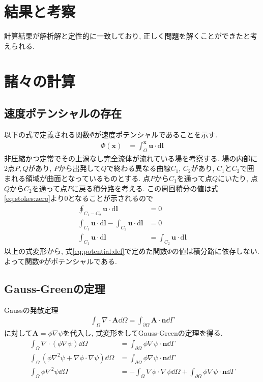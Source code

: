 \documentclass{ltjsarticle}
\begin{document}
\section{結果と考察}
計算結果が解析解と定性的に一致しており, 正しく問題を解くことができたと考えられる.

\clearpage
\printbibliography[title=参考文献]

\appendix
\section{諸々の計算}
\subsection{速度ポテンシャルの存在}
\label{appendix:potential}
以下の式で定義される関数$\Phi$が速度ポテンシャルであることを示す.
\begin{align}
    \Phi(\bm{x}) &= \int_O^{\bm{x}} \bm{u}\cdot\mathrm{d}\bm{l} \label{eq:potential:def}
\end{align}
非圧縮かつ定常でその上渦なし完全流体が流れている場を考察する.
場の内部に2点$P,Q$があり, $P$から出発して$Q$で終わる異なる曲線$C_1$, $C_2$があり,
$C_1$と$C_2$で囲まれる領域が曲面となっているものとする.
点$P$から$C_1$を通って点$Q$にいたり, 点$Q$から$C_2$を通って点$P$に戻る積分路を考える.
この周回積分の値は式\eqref{eq:stokes:zero}より0となることが示されるので
\begin{align}
    \oint_{C_1-C_2}\bm{u}\cdot\mathrm{d}\bm{l} &= 0 \\
    \int_{C_1}\bm{u}\cdot\mathrm{d}\bm{l}-\int_{C_2}\bm{u}\cdot\mathrm{d}\bm{l} &=0\\
    \int_{C_1}\bm{u}\cdot\mathrm{d}\bm{l}&=\int_{C_2}\bm{u}\cdot\mathrm{d}\bm{l}
\end{align}
以上の式変形から, 式\eqref{eq:potential:def}で定めた関数$\Phi$の値は積分路に依存しない.
よって関数$\Phi$がポテンシャルである.

\subsection{Gauss-Greenの定理}
\label{appendix:gauss_green}
Gaussの発散定理
\begin{align}
    \int_\Omega\nabla\cdot\bm{A}\dd{\Omega} =\int_{\partial\Omega}\bm{A}\cdot\bm{n}\dd{\Gamma}
    \label{eq:divergence_theorem}
\end{align}
に対して$\bm{A}=\phi\nabla\psi$を代入し, 式変形をしてGauss-Greenの定理を得る.
\begin{align}
    \int_\Omega\nabla\cdot(\phi\nabla\psi)\dd{\Omega} 
    &=\int_{\partial\Omega}\phi\nabla\psi\cdot\bm{n}\dd{\Gamma} \\
    \int_\Omega(\phi\nabla^2\psi+\nabla\phi\cdot\nabla\psi)\dd{\Omega} 
    &=\int_{\partial\Omega}\phi\nabla\psi\cdot\bm{n}\dd{\Gamma} \\
    \int_\Omega\phi\nabla^2\psi\dd{\Omega} 
    &=- \int_\Omega\nabla\phi\cdot\nabla\psi\dd{\Omega}
    +\int_{\partial\Omega}\phi\nabla\psi\cdot\bm{n}\dd{\Gamma}
\end{align}
\end{document}
